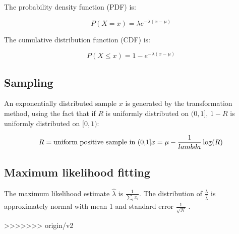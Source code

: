 The probability density function (PDF) is:

\begin{equation}
P(X=x) =  \lambda e^{-\lambda (x - \mu)}
\end{equation}

The cumulative distribution function (CDF) is:

\begin{equation}
P(X \leq x) = 1 - e^{-\lambda (x - \mu)}
\end{equation}


\subsection{Sampling}

An exponentially distributed sample $x$ is generated by the
transformation method, using the fact that if $R$ is uniformly
distributed on $(0,1]$, $1-R$ is uniformly distributed on $[0,1)$:

\[
   R = \mbox{uniform positive sample in (0,1]}\\
   x = \mu - \frac{1}{lambda} \log(R)
\]

\subsection{Maximum likelihood fitting}

The maximum likelihood estimate $\hat{\lambda}$ is $\frac{1}{\sum_i
x_i}$. The distribution of $\frac{\lambda}{\hat{\lambda}}$ is
approximately normal with mean 1 and standard error $\frac{1}{\sqrt{N}}$
\citep{Lawless82}.



>>>>>>> origin/v2
